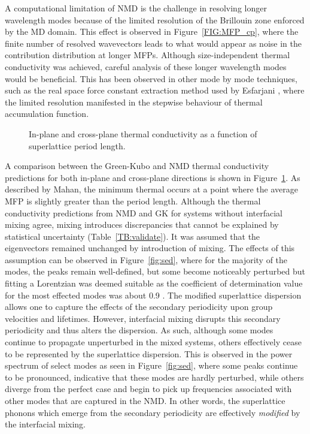 \documentclass[aps,prb,preprint,preprintnumbers,amsmath,amssymb,floatfix,superscriptaddress]{revtex4}
\begin{document}
A computational limitation of NMD is the challenge in resolving longer wavelength modes because of the limited resolution of the Brillouin zone enforced by the MD domain. This effect is observed in Figure~\ref{FIG:MFP_cp}, where the finite number of resolved wavevectors leads to what would appear as noise in the contribution distribution at longer MFPs. Although size-independent thermal conductivity was achieved, careful analysis of these longer wavelength modes would be beneficial. This has been observed in other mode by mode techniques, such as the real space force constant extraction method used by Esfarjani \cite{PhysRevB.84.085204}, where the limited resolution manifested in the stepwise behaviour of thermal accumulation function.

\begin{figure}%
\begin{center}
\renewcommand{\figure}{Fig.}
\caption{In-plane and cross-plane thermal conductivity as a function of superlattice period length.}
\label{FIG:NMD_v_GK}
\end{center}
\end{figure}

A comparison between the Green-Kubo and NMD thermal conductivity predictions for both in-plane and cross-plane directions is shown in Figure~\ref{FIG:NMD_v_GK}. As described by Mahan, the minimum thermal occurs at a point where the average MFP is slightly greater than the period length. Although the thermal conductivity predictions from NMD and GK for systems without interfacial mixing agree, mixing introduces discrepancies that cannot be explained by statistical uncertainty (Table~\ref{TB:validate}). It was assumed that the eigenvectors remained unchanged by introduction of mixing. The effects of this assumption can be observed in Figure~\ref{fig:sed}, where for the majority of the modes, the peaks remain well-defined, but some become noticeably perturbed but fitting a Lorentzian was deemed suitable as the coefficient of determination value for the most effected modes was about 0.9 \cite{Cowpe20081066}. The modified superlattice dispersion allows one to capture the effects of the secondary periodicity upon group velocities and lifetimes. However, interfacial mixing disrupts this secondary periodicity and thus alters the dispersion. As such, although some modes continue to propagate unperturbed in the mixed systems, others effectively cease to be represented by the superlattice dispersion. This is observed in the power spectrum of select modes as seen in Figure~\ref{fig:sed}, where some peaks continue to be pronounced, indicative that these modes are hardly perturbed, while others diverge from the perfect case and begin to pick up frequencies associated with other modes that are captured in the NMD. In other words, the superlattice phonons which emerge from the secondary periodicity are effectively \textit{modified} by the interfacial mixing.
\end{document}
